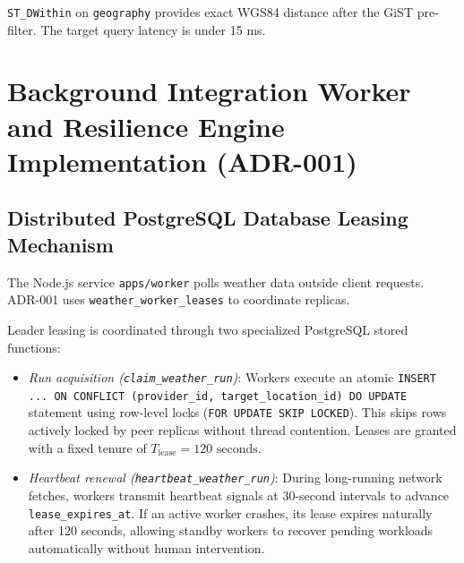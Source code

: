 \texttt{ST\_DWithin} on \texttt{geography} provides exact WGS84 distance after the GiST pre-filter. The target query latency is under 15 ms.

\section{Background Integration Worker and Resilience Engine Implementation (ADR-001)}
\label{sec:worker_resilience_impl}

\subsection{Distributed PostgreSQL Database Leasing Mechanism}
The Node.js service \texttt{apps/worker} polls weather data outside client requests. ADR-001 uses \texttt{weather\_worker\_leases} to coordinate replicas.

Leader leasing is coordinated through two specialized PostgreSQL stored functions:
\begin{itemize}
    \item[-] \textit{Run acquisition (\texttt{claim\_weather\_run})}: Workers execute an atomic \texttt{INSERT ... ON CONFLICT (provider\_id, target\_location\_id) DO UPDATE} statement using row-level locks (\texttt{FOR UPDATE SKIP LOCKED}). This skips rows actively locked by peer replicas without thread contention. Leases are granted with a fixed tenure of $T_{\text{lease}} = 120\text{ seconds}$.
    \item[-] \textit{Heartbeat renewal (\texttt{heartbeat\_weather\_run})}: During long-running network fetches, workers transmit heartbeat signals at 30-second intervals to advance \texttt{lease\_expires\_at}. If an active worker crashes, its lease expires naturally after 120 seconds, allowing standby workers to recover pending workloads automatically without human intervention.
\end{itemize}

